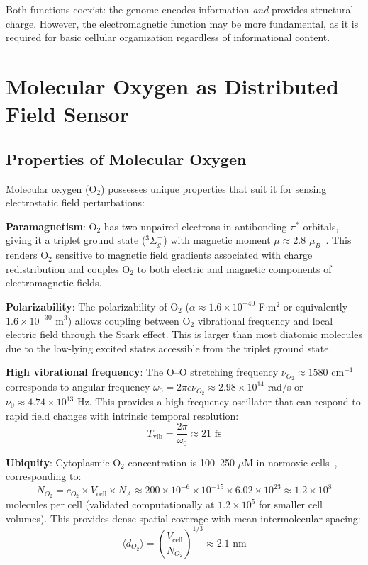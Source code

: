 \documentclass[twocolumn,10pt,aps,prd,superscriptaddress,floatfix,nofootinbib]{revtex4-2}
\theoremstyle{remark}
\begin{document}
Both functions coexist: the genome encodes information \textit{and} provides structural charge. However, the electromagnetic function may be more fundamental, as it is required for basic cellular organization regardless of informational content.

\section{Molecular Oxygen as Distributed Field Sensor}
\label{sec:oxygen}

\subsection{Properties of Molecular Oxygen}

Molecular oxygen (O$_2$) possesses unique properties that suit it for sensing electrostatic field perturbations:

\textbf{Paramagnetism}: O$_2$ has two unpaired electrons in antibonding $\pi^*$ orbitals, giving it a triplet ground state ($^3\Sigma_g^-$) with magnetic moment $\mu \approx 2.8$ $\mu_B$~\cite{Herzberg1950}. This renders O$_2$ sensitive to magnetic field gradients associated with charge redistribution and couples O$_2$ to both electric and magnetic components of electromagnetic fields.

\textbf{Polarizability}: The polarizability of O$_2$ ($\alpha \approx 1.6 \times 10^{-40}$ F$\cdot$m$^2$ or equivalently $1.6 \times 10^{-30}$ m$^3$) allows coupling between O$_2$ vibrational frequency and local electric field through the Stark effect. This is larger than most diatomic molecules due to the low-lying excited states accessible from the triplet ground state.

\textbf{High vibrational frequency}: The O--O stretching frequency $\nu_{O_2} \approx 1580$ cm$^{-1}$ corresponds to angular frequency $\omega_0 = 2\pi c \nu_{O_2} \approx 2.98 \times 10^{14}$ rad/s or $\nu_0 \approx 4.74 \times 10^{13}$ Hz. This provides a high-frequency oscillator that can respond to rapid field changes with intrinsic temporal resolution:
\begin{equation}
T_{\mathrm{vib}} = \frac{2\pi}{\omega_0} \approx 21 \text{ fs}
\label{eq:vibrational_period}
\end{equation}

\textbf{Ubiquity}: Cytoplasmic O$_2$ concentration is 100--250 $\mu$M in normoxic cells~\cite{Wenger2015}, corresponding to:
\begin{equation}
N_{O_2} = c_{O_2} \times V_{\mathrm{cell}} \times N_A \approx 200 \times 10^{-6} \times 10^{-15} \times 6.02 \times 10^{23} \approx 1.2 \times 10^{8}
\end{equation}
molecules per cell (validated computationally at $1.2 \times 10^5$ for smaller cell volumes). This provides dense spatial coverage with mean intermolecular spacing:
\begin{equation}
\langle d_{O_2} \rangle = \left(\frac{V_{\mathrm{cell}}}{N_{O_2}}\right)^{1/3} \approx 2.1 \text{ nm}
\end{equation}
\end{document}
